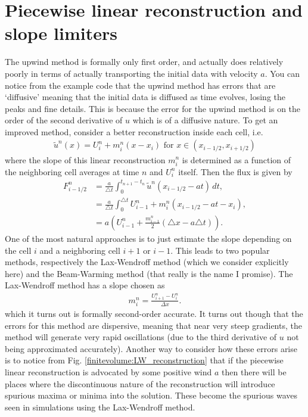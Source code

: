 \section*{Piecewise linear reconstruction and slope limiters}
The upwind method is formally only first order, and actually does relatively poorly in terms of actually transporting the initial data with velocity $a$.  You can notice from the example code that the upwind method has errors that are `diffusive' meaning that the initial data is diffused as time evolves, losing the peaks and fine details.  This is because the error for the upwind method is on the order of the second derivative of $u$ which is of a diffusive nature.  To get an improved method, consider a better reconstruction inside each cell, i.e.
\begin{gather}
\tilde{u}^n(x) = U_i^n + m_i^n(x-x_i) \mbox{ for } x \in (x_{i-1/2},x_{i+1/2})
\end{gather}
where the slope of this linear reconstruction $m_i^n$ is determined as a function of the neighboring cell averages at time $n$ and $U_i^n$ itself. 
Then the flux is given by  
\begin{align}
F_{i-1/2}^n %
&= \frac{a}{\triangle t}\int_{0}^{t_{n+1}-t_n} \tilde{u}^n(x_{i-1/2}-at)\, dt  ,\\
&= \frac{a}{\triangle t}\int_{0}^{\triangle t} U_{i-1}^n + m_i^n(x_{i-1/2} - at - x_i), \\
&= a \left( U_{i-1}^n + \frac{m_{i-1}^n}{2} (\triangle x - a \triangle t)\right).
\end{align}
One of the most natural approaches is to just estimate the slope depending on the cell $i$ and a neighboring cell $i+1$ or $i-1$.  This leads to two popular methods, respectively the Lax-Wendroff method (which we consider explicitly here) and the Beam-Warming method (that really is the name I promise).  The Lax-Wendroff method has a slope chosen as
\begin{gather}
m_i^n = \frac{U^n_{i+1}-U_{i}^n}{\Delta x}.
\end{gather}
which it turns out is formally second-order accurate.  It turns out though that the errors for this method are dispersive, meaning that near very steep gradients, the method will generate very rapid oscillations (due to the third derivative of $u$ not being approximated accurately).  Another way to consider how these errors arise is to notice from Fig. \ref{finitevolume:LW_reconstruction} that if the piecewise linear reconstruction is advocated by some positive wind $a$ then there will be places where the discontinuous nature of the reconstruction will introduce spurious maxima or minima into the solution.  These become the spurious waves seen in simulations using the Lax-Wendroff method.

